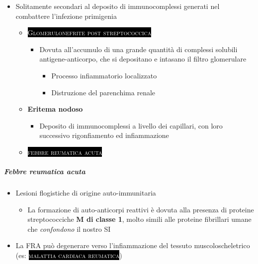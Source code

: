 \documentclass[italian,]{article}
\providecommand{\tightlist}{%
  \setlength{\itemsep}{0pt}\setlength{\parskip}{0pt}}
\newcommand{\pat}[1]{\colorbox{black}{\textcolor{white}{\textsc{#1}}}}
\begin{document}
\begin{itemize}
\tightlist
\item
  Solitamente secondari al deposito di immunocomplessi generati nel
  combattere l'infezione primigenia

  \begin{itemize}
  \item
    \pat{Glomerulonefrite post streptococcica}~

    \begin{itemize}
    \tightlist
    \item
      Dovuta all'accumulo di una grande quantità di complessi solubili
      antigene-anticorpo, che si depositano e intasano il filtro
      glomerulare

      \begin{itemize}
      \tightlist
      \item
        Processo infiammatorio localizzato
      \item
        Distruzione del parenchima renale
      \end{itemize}
    \end{itemize}
  \item
    \textbf{Eritema nodoso}

    \begin{itemize}
    \tightlist
    \item
      Deposito di immunocomplessi a livello dei capillari, con loro
      successivo rigonfiamento ed infiammazione
    \end{itemize}
  \item
    \pat{febbre reumatica acuta}
  \end{itemize}
\end{itemize}

\hypertarget{febbre-reumatica-acuta}{%
\subparagraph{Febbre reumatica acuta}\label{febbre-reumatica-acuta}}

\begin{itemize}
\tightlist
\item
  Lesioni flogistiche di origine auto-immunitaria

  \begin{itemize}
  \tightlist
  \item
    La formazione di auto-anticorpi reattivi è dovuta alla presenza di
    proteine streptococciche \textbf{M di classe 1}, molto simili alle
    proteine fibrillari umane che \emph{confondono} il nostro SI
  \end{itemize}
\item
  La FRA può degenerare verso l'infiammazione del tessuto
  muscoloscheletrico (es: \pat{malattia cardiaca reumatica})
\end{itemize}
\end{document}
